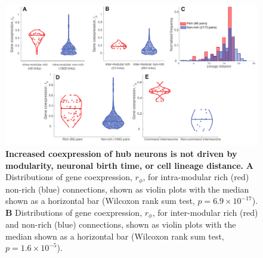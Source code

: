 \documentclass[10pt,letterpaper]{article}
\begin{document}
{%
\begin{figure}[!h]
\centering
    \includegraphics[width=1\textwidth]{extrasALL2.pdf}
 \caption{
 \textbf{Increased coexpression of hub neurons is not driven by modularity, neuronal birth time, or cell lineage distance.}
\textbf{A} Distributions of gene coexpression, $r_\phi$, for intra-modular rich (red) non-rich (blue) connections, shown as violin plots with the median shown as a horizontal bar (Wilcoxon rank sum test, $p = 6.9 \times 10^{-17}$).
\textbf{B} Distributions of gene coexpression, $r_\phi$, for inter-modular rich (red) and non-rich (blue) connections, shown as violin plots with the median shown as a horizontal bar (Wilcoxon rank sum test, $p = 1.6 \times 10^{-5}$).
}
\end{figure}}
\end{document}
